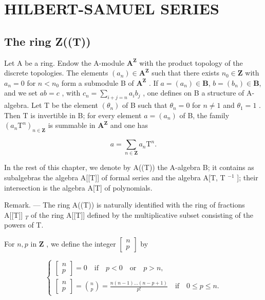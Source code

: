 \section{HILBERT-SAMUEL SERIES}

\subsection{The ring Z((T))}

Let A be a ring. Endow the A-module \(\mathbf{A}^{\mathbf{Z}}\) with the product topology of the discrete topologies. The elements \((a_{n})\in\mathbf{A}^{\mathbf{Z}}\) such that there exists \(n_{0}\in\mathbf{Z}\) with \(a_{n}=0\) for \(n<n_{0}\) form a submodule B of \(\mathbf{A}^{\mathbf{Z}}\) . If \(a=(a_{n})\in\mathbf{B}\), \(b=(b_{n})\in\mathbf{B}\), and we set \(ab=c\) , with \(c_{n}=\sum_{i+j=n}a_{i}b_{j}\) , one defines on B a structure of A-algebra. Let T be the element \((\theta_{n})\) of B such that \(\theta_{n}=0\) for \(n\neq1\) and \(\theta_{1}=1\) . Then T is invertible in B; for every element \(a=(a_{n})\) of B, the family \((a_{n}\mathrm{T}^{n})_{n\in\mathbf{Z}}\) is summable in \(\mathbf{A}^{\mathbf{Z}}\) and one has

\[
a = \sum_ {n \in \mathbf {Z}} a _ {n} \mathrm{T} ^ {n}.
\]

In the rest of this chapter, we denote by A((T)) the A-algebra B; it contains as subalgebras the algebra A{[}{[}T{]}{]} of formal series and the algebra A{[}T, T \(^{-1}\) {]}; their intersection is the algebra A{[}T{]} of polynomials.

Remark. --- The ring A((T)) is naturally identified with the ring of fractions A{[}{[}T{]}{]} \(_{T}\) of the ring A{[}{[}T{]}{]} defined by the multiplicative subset consisting of the powers of T.

For \(n, p\) in \(\mathbf{Z}\) , we define the integer \(\begin{bmatrix} n \\ p \end{bmatrix}\) by

\[
\left\{ \begin{array}{l} {\left[ \begin{array}{l} n \\ p \end{array} \right] = 0 \quad \text {if} \quad p <   0 \quad \text {or} \quad p > n,} \\ {\left[ \begin{array}{l} n \\ p \end{array} \right] = \binom {n} {p} = \frac {n (n - 1) \dots (n - p + 1)}{p !} \quad \text {if} \quad 0 \leqslant p \leqslant n.} \end{array} \right.\tag{1}
\]

